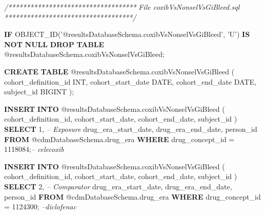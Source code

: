 \documentclass[]{article}
\newenvironment{Shaded}{\begin{snugshade}}{\end{snugshade}}
\newcommand{\CommentTok}[1]{\textcolor[rgb]{0.56,0.35,0.01}{\textit{#1}}}
\newcommand{\DataTypeTok}[1]{\textcolor[rgb]{0.13,0.29,0.53}{#1}}
\newcommand{\DecValTok}[1]{\textcolor[rgb]{0.00,0.00,0.81}{#1}}
\newcommand{\KeywordTok}[1]{\textcolor[rgb]{0.13,0.29,0.53}{\textbf{#1}}}
\newcommand{\NormalTok}[1]{#1}
\newcommand{\StringTok}[1]{\textcolor[rgb]{0.31,0.60,0.02}{#1}}
\begin{document}
\begin{Shaded}
\begin{Highlighting}[]
\CommentTok{/***********************************}
\CommentTok{File coxibVsNonselVsGiBleed.sql}
\CommentTok{***********************************/}

\KeywordTok{IF}\NormalTok{ OBJECT_ID(}\StringTok{'@resultsDatabaseSchema.coxibVsNonselVsGiBleed'}\NormalTok{, }\StringTok{'U'}\NormalTok{) }\KeywordTok{IS} \KeywordTok{NOT} \KeywordTok{NULL}
  \KeywordTok{DROP} \KeywordTok{TABLE}\NormalTok{ @resultsDatabaseSchema.coxibVsNonselVsGiBleed;}

\KeywordTok{CREATE} \KeywordTok{TABLE}\NormalTok{ @resultsDatabaseSchema.coxibVsNonselVsGiBleed (}
\NormalTok{  cohort_definition_id }\DataTypeTok{INT}\NormalTok{,}
\NormalTok{  cohort_start_date }\DataTypeTok{DATE}\NormalTok{,}
\NormalTok{    cohort_end_date }\DataTypeTok{DATE}\NormalTok{,}
\NormalTok{    subject_id BIGINT}
\NormalTok{    );}

\KeywordTok{INSERT} \KeywordTok{INTO}\NormalTok{ @resultsDatabaseSchema.coxibVsNonselVsGiBleed (}
\NormalTok{    cohort_definition_id,}
\NormalTok{    cohort_start_date,}
\NormalTok{    cohort_end_date,}
\NormalTok{    subject_id}
\NormalTok{    )}
\KeywordTok{SELECT} \DecValTok{1}\NormalTok{, }\CommentTok{-- Exposure}
\NormalTok{    drug_era_start_date,}
\NormalTok{    drug_era_end_date,}
\NormalTok{    person_id}
\KeywordTok{FROM}\NormalTok{ @cdmDatabaseSchema.drug_era}
\KeywordTok{WHERE}\NormalTok{ drug_concept_id = }\DecValTok{1118084}\NormalTok{;}\CommentTok{-- celecoxib}

\KeywordTok{INSERT} \KeywordTok{INTO}\NormalTok{ @resultsDatabaseSchema.coxibVsNonselVsGiBleed (}
\NormalTok{    cohort_definition_id,}
\NormalTok{    cohort_start_date,}
\NormalTok{    cohort_end_date,}
\NormalTok{    subject_id}
\NormalTok{    )}
\KeywordTok{SELECT} \DecValTok{2}\NormalTok{, }\CommentTok{-- Comparator}
\NormalTok{    drug_era_start_date,}
\NormalTok{    drug_era_end_date,}
\NormalTok{    person_id}
\KeywordTok{FROM}\NormalTok{ @cdmDatabaseSchema.drug_era}
\KeywordTok{WHERE}\NormalTok{ drug_concept_id = }\DecValTok{1124300}\NormalTok{; }\CommentTok{--diclofenac}


\end{Highlighting}
\end{Shaded}
\end{document}

